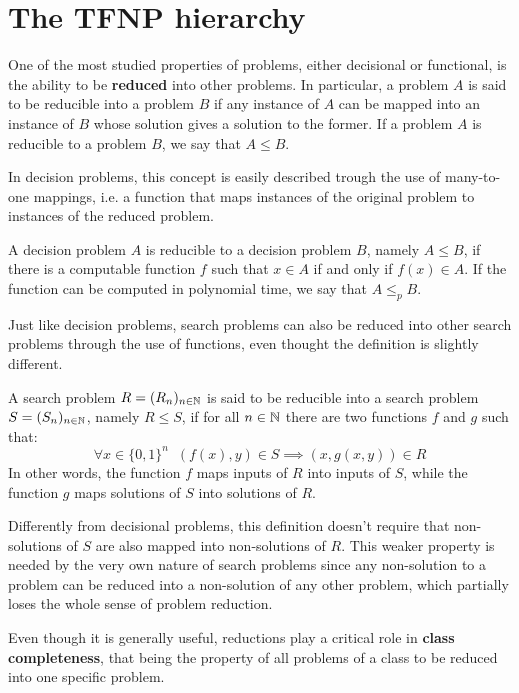 \section{The \textsf{TFNP} hierarchy}

One of the most studied properties of problems, either decisional or functional, is the ability to be \textbf{reduced} into other problems. In particular, a problem $A$ is said to be reducible into a problem $B$ if any instance of $A$ can be mapped into an instance of $B$ whose solution gives a solution to the former. If a problem $A$ is reducible to a problem $B$, we say that $A \leq B$.

In decision problems, this concept is easily described trough the use of many-to-one mappings, i.e. a function that maps instances of the original problem to instances of the reduced problem. 

\begin{definition}
    A decision problem $A$ is reducible to a decision problem $B$, namely $A \leq B$, if there is a computable function $f$ such that $x \in A$ if and only if $f(x) \in A$. If the function can be computed in polynomial time, we say that $A \leq_p B$.
\end{definition}

Just like decision problems, search problems can also be reduced into other search problems through the use of functions, even thought the definition is slightly different.

\begin{definition}
    A search problem $R = (R_n)_{n \in \mathbb{N}}$ is said to be reducible into a search problem $S = (S_n)_{n \in \mathbb{N}}$, namely $R \leq S$, if for all $n \in \mathbb{N}$ there are two functions $f$ and $g$ such that:
    \[\forall x \in \{0,1\}^n \;\; (f(x), y) \in S \implies (x, g(x,y)) \in R\]
    In other words, the function $f$ maps inputs of $R$ into inputs of $S$, while the function $g$ maps solutions of $S$ into solutions of $R$. 
\end{definition}

Differently from decisional problems, this definition doesn't require that non-solutions of $S$ are also mapped into non-solutions of $R$. This weaker property is needed by the very own nature of search problems since any non-solution to a problem can be reduced into a non-solution of any other problem, which partially loses the whole sense of problem reduction.

Even though it is generally useful, reductions play a critical role in \textbf{class completeness}, that being the property of all problems of a class to be reduced into one specific problem.

